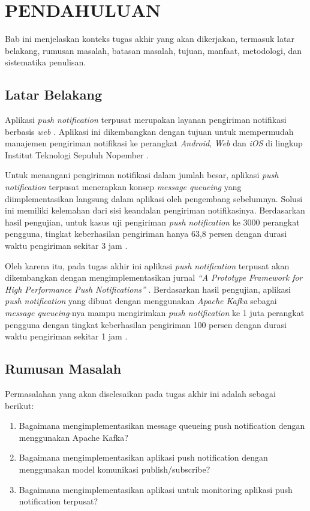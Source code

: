 \vspace{0ex}
\chapter {PENDAHULUAN}

Bab ini menjelaskan konteks tugas akhir yang akan dikerjakan, termasuk latar belakang, rumusan masalah, batasan masalah, tujuan, manfaat, metodologi, dan sistematika penulisan.

\section{Latar Belakang}
\par Aplikasi \textit{push notification} terpusat merupakan layanan pengiriman notifikasi berbasis \textit{web} \cite{application-thesis}. Aplikasi ini dikembangkan dengan tujuan untuk mempermudah manajemen pengiriman notifikasi ke perangkat \textit{Android}, \textit{Web} dan \textit{iOS} di lingkup Institut Teknologi Sepuluh Nopember \cite{application-thesis}.
\par Untuk menangani pengiriman notifikasi dalam jumlah besar, aplikasi \textit{push notification} terpusat menerapkan konsep \textit{message queueing} yang diimplementasikan langsung dalam aplikasi oleh pengembang sebelumnya. Solusi ini memiliki kelemahan dari sisi keandalan pengiriman notifikasinya. Berdasarkan hasil pengujian, untuk kasus uji pengiriman \textit{push notification} ke 3000 perangkat pengguna, tingkat keberhasilan pengiriman hanya 63,8 persen dengan durasi waktu pengiriman sekitar 3 jam \cite{application-thesis}.
\par Oleh karena itu, pada tugas akhir ini aplikasi \textit{push notification} terpusat akan dikembangkan dengan mengimplementasikan jurnal \textit{“A Prototype Framework for High Performance Push Notifications”} \cite{prototype-article}. Berdasarkan hasil pengujian, aplikasi \textit{push notification} yang dibuat dengan menggunakan \textit{Apache Kafka} sebagai \textit{message queueing}-nya mampu mengirimkan \textit{push notification} ke 1 juta perangkat pengguna dengan tingkat keberhasilan pengiriman 100 persen dengan durasi waktu pengiriman sekitar 1 jam \cite{prototype-article}.

\section {Rumusan Masalah}
Permasalahan yang akan diselesaikan pada tugas akhir ini adalah sebagai berikut:
\begin {enumerate}
\item Bagaimana mengimplementasikan message queueing push notification dengan menggunakan Apache Kafka?
\item Bagaimana mengimplementasikan aplikasi push notification dengan menggunakan model komunikasi publish/subscribe?
\item Bagaimana mengimplementasikan aplikasi untuk monitoring aplikasi push notification terpusat?
\end {enumerate}

